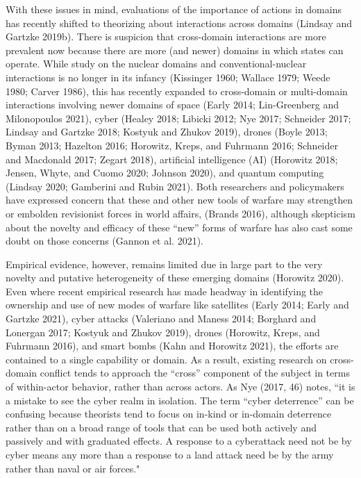 \documentclass[
]{article}
\begin{document}
With these issues in mind, evaluations of the importance of actions in domains has recently shifted to theorizing about interactions across domains (Lindsay and Gartzke 2019b). There is suspicion that cross-domain interactions are more prevalent now because there are more (and newer) domains in which states can operate. While study on the nuclear domains and conventional-nuclear interactions is no longer in its infancy (Kissinger 1960; Wallace 1979; Weede 1980; Carver 1986), this has recently expanded to cross-domain or multi-domain interactions involving newer domains of space (Early 2014; Lin-Greenberg and Milonopoulos 2021), cyber (Healey 2018; Libicki 2012; Nye 2017; Schneider 2017; Lindsay and Gartzke 2018; Kostyuk and Zhukov 2019), drones (Boyle 2013; Byman 2013; Hazelton 2016; Horowitz, Kreps, and Fuhrmann 2016; Schneider and Macdonald 2017; Zegart 2018), artificial intelligence (AI) (Horowitz 2018; Jensen, Whyte, and Cuomo 2020; Johnson 2020), and quantum computing (Lindsay 2020; Gamberini and Rubin 2021). Both researchers and policymakers have expressed concern that these and other new tools of warfare may strengthen or embolden revisionist forces in world affairs, (Brands 2016), although skepticism about the novelty and efficacy of these ``new'' forms of warfare has also cast some doubt on those concerns (Gannon et al. 2021).

Empirical evidence, however, remains limited due in large part to the very novelty and putative heterogeneity of these emerging domains (Horowitz 2020). Even where recent empirical research has made headway in identifying the ownership and use of new modes of warfare like satellites (Early 2014; Early and Gartzke 2021), cyber attacks (Valeriano and Maness 2014; Borghard and Lonergan 2017; Kostyuk and Zhukov 2019), drones (Horowitz, Kreps, and Fuhrmann 2016), and smart bombs (Kahn and Horowitz 2021), the efforts are contained to a single capability or domain. As a result, existing research on cross-domain conflict tends to approach the ``cross'' component of the subject in terms of within-actor behavior, rather than across actors. As Nye (2017, 46) notes, ``it is a mistake to see the cyber realm in isolation. The term ``cyber deterrence'' can be confusing because theorists tend to focus on in-kind or in-domain deterrence rather than on a broad range of tools that can be used both actively and passively and with graduated effects. A response to a cyberattack need not be by cyber means any more than a response to a land attack need be by the army rather than naval or air forces."
\end{document}
